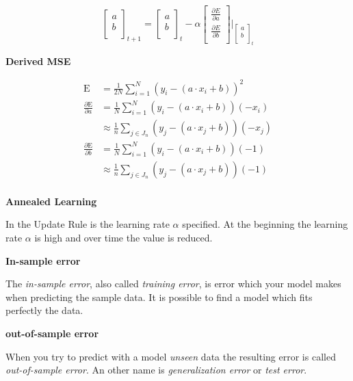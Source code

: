 \documentclass[11pt,twoside,landscape]{article}
\begin{document}
\begin{multicols}{3}
\begin{equation}
  \begin{bmatrix}
    a \\
    b \\
  \end{bmatrix}_{t+1} 
  =    \begin{bmatrix}
    a \\
    b \\
  \end{bmatrix}_{t} - \alpha 
  \begin{bmatrix}
    \frac{\partial E}{\partial a} \\
    \frac{\partial E}{\partial b} \\
  \end{bmatrix} \Big\rvert _{\begin{bmatrix}
      a \\
      b \\
    \end{bmatrix}_{t} }
\end{equation}

\textbf{Derived MSE}

\begin{align}
  \textrm{E} &= \frac{1}{2N} \sum_{i=1}^{N} (y_i - (a \cdot x_i + b))^2 \\
  \frac{\partial \textrm{E}}{\partial a} &= \frac{1}{N} \sum_{i=1}^{N} (y_i - (a \cdot x_i + b)) (-x_i) \\
  &\approx \frac{1}{n} \sum_{j \in J_n} (y_j - (a \cdot x_j + b)) (-x_j)  \\
  \frac{\partial \textrm{E}}{\partial b} &= \frac{1}{N} \sum_{i=1}^{N} (y_i - (a \cdot x_i + b)) (-1) \\
  &\approx \frac{1}{n} \sum_{j \in J_n} (y_{j} - (a \cdot x_{j} + b)) (-1)  \\
\end{align}


\textbf{Annealed Learning}

In the Update Rule is the learning rate \(\alpha\) specified.
At the beginning the learning rate \(\alpha\) is high and over time the value is reduced.


\textbf{In-sample error}

The \emph{in-sample error}, also called \emph{training error}, is error which your model makes when predicting the sample data.
It is possible to find a model which fits perfectly the data.

\textbf{out-of-sample error}

When you try to predict with a model \emph{unseen} data the resulting error is called \emph{out-of-sample error}.
An other name is \emph{generalization error} or \emph{test error}.



\end{multicols}
\end{document}
